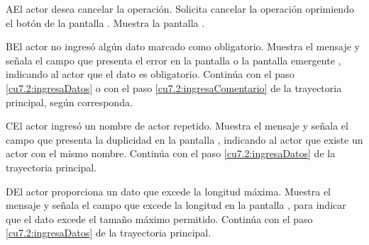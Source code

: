  \begin{UCtrayectoriaA}{A}{El actor desea cancelar la operación.}
    \UCpaso[\UCactor] Solicita cancelar la operación oprimiendo el botón  de la pantalla .
    \UCpaso[\UCsist] Muestra la pantalla .
 \end{UCtrayectoriaA} 
 \begin{UCtrayectoriaA}{B}{El actor no ingresó algún dato marcado como obligatorio.}
    \UCpaso[\UCsist] Muestra el mensaje  y señala el campo que presenta el error en la pantalla 
	     o la pantalla emergente , indicando al actor que el dato es obligatorio.
    \UCpaso[] Continúa con el paso \ref{cu7.2:ingresaDatos} o con el paso \ref{cu7.2:ingresaComentario} de la trayectoria principal, según corresponda.
 \end{UCtrayectoriaA}
 \begin{UCtrayectoriaA}{C}{El actor ingresó un nombre de actor repetido.}
    \UCpaso[\UCsist] Muestra el mensaje  y señala el campo que presenta la duplicidad en la pantalla 
	    , indicando al actor que existe un actor con el mismo nombre.
    \UCpaso[] Continúa con el paso \ref{cu7.2:ingresaDatos} de la trayectoria principal.
 \end{UCtrayectoriaA}
 
 \begin{UCtrayectoriaA}{D}{El actor proporciona un dato que excede la longitud máxima.}
    \UCpaso[\UCsist] Muestra el mensaje  y señala el campo que excede la 
    longitud en la pantalla , para indicar que el dato excede el tamaño máximo permitido.
    \UCpaso[] Continúa con el paso \ref{cu7.2:ingresaDatos} de la trayectoria principal.
 \end{UCtrayectoriaA}
 
